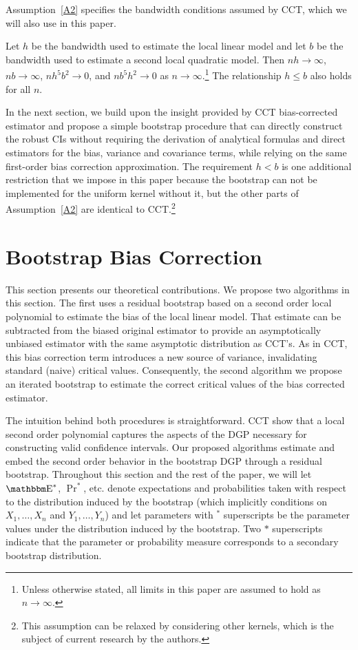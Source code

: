 \documentclass[12pt,fleqn]{article}
\begin{document}
Assumption~\ref{A2} specifies the bandwidth conditions assumed by CCT, which we
will also use in this paper.
\begin{assumption}[Bandwidth]\label{A2}
  Let $h$ be the bandwidth used to estimate the local linear model and let
  $b$ be the bandwidth used to estimate a second local quadratic model. Then
  $n h \to \infty$, $n b \to \infty$, $n h^{5} b^{2} \to 0$, and
  $n b^{5} h^{2} \to 0$ as $n \to \infty$.\footnote{%
    Unless otherwise stated, all limits in this paper are assumed to hold as
    $n \to \infty$.} %
  The relationship $h \leq b$ also holds for all $n$.
\end{assumption}

In the next section, we build upon the insight provided by CCT bias-corrected
estimator and propose a simple bootstrap procedure that can directly construct
the robust CIs without requiring the derivation of analytical formulas and
direct estimators for the bias, variance and covariance terms, while relying on
the same first-order bias correction approximation. The requirement $h < b$ is
one additional restriction that we impose in this paper because the bootstrap
can not be implemented for the uniform kernel without it, but the other parts of
Assumption~\ref{A2} are identical to CCT.\footnote{%
  This assumption can be relaxed by considering other kernels, which is the
  subject of current research by the authors.} %

\section{Bootstrap Bias Correction}\label{boot}

This section presents our theoretical contributions. We propose two algorithms
in this section. The first uses a residual bootstrap based on a second
order local polynomial to estimate the bias of the local linear model. That
estimate can be subtracted from the biased original estimator to provide an
asymptotically unbiased estimator with the same asymptotic distribution as
CCT's. As in CCT, this bias correction term introduces a new source of variance,
invalidating standard (naive) critical values. Consequently, the second
algorithm we propose an iterated bootstrap to estimate the correct
critical values of the bias corrected estimator.

The intuition behind both procedures is straightforward. CCT show that a
local second order polynomial captures the aspects of the DGP
necessary for constructing valid confidence intervals. Our proposed algorithms
estimate and embed the second order behavior in the bootstrap DGP through a
residual bootstrap. Throughout this section and the rest of the paper, we will
let $\E^{*}$, $\Pr^{*}$, etc. denote expectations and probabilities taken with
respect to the distribution induced by the bootstrap (which implicitly
conditions on $X_{1},\dots,X_{n}$ and $Y_{1},\dots,Y_{n}$) and let parameters with
$^{*}$ superscripts be the parameter values under the distribution induced by
the bootstrap. Two $*$ superscripts indicate that the parameter or probability
measure corresponds to a secondary bootstrap distribution.
\end{document}
